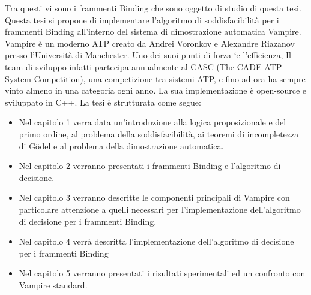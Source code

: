 \documentclass[./main.tex]{subfiles}
\begin{document}
Tra questi vi sono i frammenti Binding che sono oggetto di studio di questa tesi.
% 
Questa tesi si propone di implementare l'algoritmo di soddisfacibilità per i frammenti Binding
all'interno del sistema di dimostrazione automatica Vampire.
% 
Vampire è un moderno ATP creato da Andrei Voronkov e Alexandre Riazanov presso l'Università di Manchester.
Uno dei suoi punti di forza `e l’efficienza, Il team di sviluppo infatti partecipa
annualmente al CASC (The CADE ATP System Competition), una competizione tra sistemi ATP, e
fino ad ora ha sempre vinto almeno in una categoria ogni anno.
La sua implementazione è open-source e sviluppato in C++.
% 
La tesi è strutturata come segue:
\begin{itemize}
    \item Nel capitolo 1 verra data un'introduzione 
    alla logica proposizionale e del primo ordine, al problema della soddisfacibilità,
    ai teoremi di incompletezza di Gödel e al problema della dimostrazione automatica.
    \item Nel capitolo 2 verranno presentati i frammenti Binding e l'algoritmo di decisione.
    \item Nel capitolo 3 verranno descritte le componenti principali di Vampire con particolare attenzione
    a quelli necessari per l'implementazione dell'algoritmo di decisione per i frammenti Binding.
    \item Nel capitolo 4 verrà descritta l'implementazione dell'algoritmo di decisione per i frammenti Binding
    \item Nel capitolo 5 verranno presentati i risultati sperimentali ed un confronto con Vampire standard.
\end{itemize}
\end{document}
